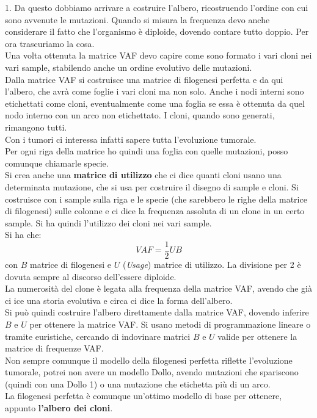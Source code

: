 \documentclass[a4paper,12pt, oneside]{book}
\begin{document}
1. Da questo dobbiamo arrivare a costruire l'albero, ricostruendo l'ordine con
cui sono avvenute le mutazioni. Quando si misura la frequenza devo anche
considerare il fatto che l'organismo è diploide, dovendo contare tutto
doppio. Per ora trascuriamo la cosa.\\
Una volta ottenuta la matrice VAF devo capire come sono formato i vari cloni nei
vari sample, stabilendo anche un ordine evolutivo delle mutazioni.\\
Dalla matrice VAF si costruisce una matrice di filogenesi perfetta e da qui
l'albero, che avrà come foglie i vari cloni ma non solo. Anche i nodi interni
sono etichettati come cloni, eventualmente come una foglia se essa è ottenuta da
quel nodo interno con un arco non etichettato. I cloni, quando sono generati,
rimangono tutti.\\ 
Con i tumori ci interessa infatti sapere tutta l'evoluzione tumorale.\\
Per ogni riga della matrice ho quindi una foglia con quelle mutazioni, posso
comunque chiamarle specie.\\
Si crea anche una \textbf{matrice di utilizzo} che ci dice quanti cloni usano
una determinata mutazione, che si usa per costruire il disegno di sample e
cloni. Si costruisce con i sample sulla riga e le specie (che sarebbero le righe
della matrice di filogenesi) sulle colonne e ci dice
la frequenza assoluta di un clone in un certo sample. Si ha quindi l'utilizzo
dei cloni nei vari sample. \\
Si ha che:
\[VAF=\frac{1}{2}UB\]
con $B$ matrice di filogenesi e $U$ (\textit{Usage}) matrice di utilizzo. La
divisione per 2 è dovuta sempre al discorso dell'essere diploide.\\
La numerosità del clone è legata alla frequenza della matrice VAF, avendo che
già ci ice una storia evolutiva e circa ci dice la forma dell'albero. \\
Si può quindi costruire l'albero direttamente dalla matrice VAF, dovendo
inferire $B$ e $U$ per ottenere la matrice VAF. Si usano metodi di
programmazione lineare o tramite euristiche, cercando di indovinare matrici $B$
e $U$ valide per ottenere la matrice di frequenze VAF.\\
Non sempre comunque il modello della filogenesi perfetta riflette l'evoluzione
tumorale, potrei non avere un modello Dollo, avendo mutazioni che spariscono
(quindi con una Dollo 1) o una mutazione che etichetta più di un arco.\\
La filogenesi perfetta è comunque un'ottimo modello di base per ottenere,
appunto \textbf{l'albero dei cloni}.
\end{document}
